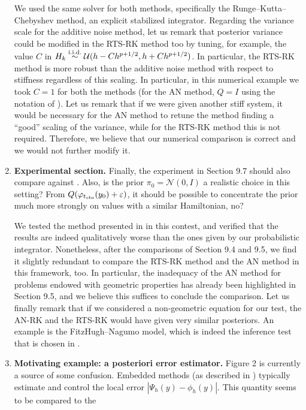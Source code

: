 \documentclass[10pt]{article}
\begin{document}
\begin{enumerate}
\begin{itquote}
	\end{itquote}
	We used the same solver for both methods, specifically the Runge--Kutta--Chebyshev method, an explicit stabilized integrator. Regarding the variance scale for the additive noise method, let us remark that posterior variance could be modified in the RTS-RK method too by tuning, for example, the value $C$ in $H_k \stackrel{\text{i.i.d.}}{\sim} \mathcal U(h - Ch^{p+1/2}, h + Ch^{p+1/2})$. In particular, the RTS-RK method is more robust than the additive noise method with respect to stiffness regardless of this scaling. In particular, in this numerical example we took $C = 1$ for both the methods (for the AN method, $Q = I$ using the notation of \cite{CGS17}). Let us remark that if we were given another stiff system, it would be necessary for the AN method to retune the method finding a ``good'' scaling of the variance, while for the RTS-RK method this is not required. Therefore, we believe that our numerical comparison is correct and we would not further modify it.
	\item 
	\begin{itquote}
		\textbf{Experimental section.} Finally, the experiment in Section 9.7 should also compare against \cite{CGS17}. Also, is the prior $\pi_0 = \mathcal N(0, I)$ a realistic choice in this setting? From $Q(\varphi_{t_\mathrm{obs}}(y_0) + \varepsilon)$, it should be possible to concentrate the prior much more strongly on values with a similar Hamiltonian, no?
	\end{itquote}
	We tested the method presented in \cite{CGS17} in this contest, and verified that the results are indeed qualitatively worse than the ones given by our probabilistic integrator. Nonetheless, after the comparisons of Section 9.4 and 9.5, we find it slightly redundant to compare the RTS-RK method and the AN method in this framework, too. In particular, the inadequacy of the AN method for problems endowed with geometric properties has already been highlighted in Section 9.5, and we believe this suffices to conclude the comparison. Let us finally remark that if we considered a non-geometric equation for our test, the AN-RK and the RTS-RK would have given very similar posteriors. An example is the FitzHugh--Nagumo model, which is indeed the inference test that is chosen in \cite{CGS17}.
	\item 
	\begin{itquote}
		\textbf{Motivating example: a posteriori error estimator.} Figure 2 is currently a source of some confusion. Embedded methods (as described in \cite{HNW93, HaW96}) typically estimate and control	the local error $|\Psi_{h}(y)−\phi_{h}(y)|$. This quantity seems to be compared to the

\end{itquote}
\end{enumerate}
\end{document}
